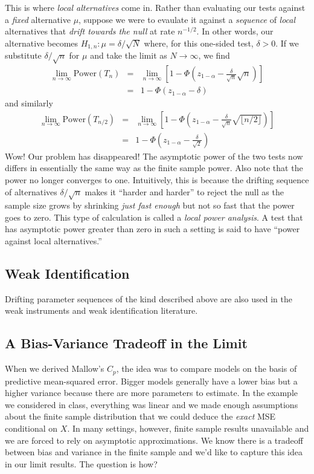 \documentclass[12pt]{article}
\theoremstyle{definition}
\begin{document}
This is where \emph{local alternatives} come in.
Rather than evaluating our tests against a \emph{fixed} alternative $\mu$, suppose we were to evaulate it against a \emph{sequence} of \emph{local} alternatives that \emph{drift towards the null} at rate $n^{-1/2}$. 
In other words, our alternative becomes $H_{1,n} \colon \mu = \delta / \sqrt{N}$ where, for this one-sided test, $\delta > 0$. 
If we substitute $\delta/\sqrt{n}$ for $\mu$ and take the limit as $N\rightarrow \infty$, we find
\begin{eqnarray*}
\lim_{n\rightarrow \infty} \mbox{Power}(T_{n}) &=& \lim_{n\rightarrow \infty}\left[1 - \Phi\left(z_{1-\alpha} - \frac{\delta}{\sqrt{n}}\sqrt{n}\right) \right]\\
&=& 1 - \Phi\left(z_{1-\alpha} - \delta \right)
\end{eqnarray*}
and similarly
\begin{eqnarray*}
\lim_{n\rightarrow \infty} \mbox{Power}(T_{n/2}) &=& \lim_{n\rightarrow \infty}\left[1 - \Phi\left(z_{1-\alpha} - \frac{\delta}{\sqrt{n}}\sqrt{\lfloor n/2 \rfloor }\right) \right]\\
&=& 1 - \Phi\left(z_{1-\alpha} - \frac{\delta}{\sqrt{2}} \right)
\end{eqnarray*}
Wow! Our problem has disappeared! 
The asymptotic power of the two tests now differs in essentially the same way as the finite sample power. 
Also note that the power no longer converges to one.
Intuitively, this is because the drifting sequence of alternatives $\delta/\sqrt{n}$ makes it ``harder and harder'' to reject the null as the sample size grows by shrinking \emph{just fast enough} but not so fast that the power goes to zero. 
This type of calculation is called a \emph{local power analysis}. 
A test that has asymptotic power greater than zero in such a setting is said to have ``power against local alternatives.''


\subsection{Weak Identification}
Drifting parameter sequences of the kind described above are also used in the weak instruments and weak identification literature.

\subsection{A Bias-Variance Tradeoff in the Limit}
When we derived Mallow's $C_p$, the idea was to compare models on the basis of predictive mean-squared error. 
Bigger models generally have a lower bias but a higher variance because there are more parameters to estimate. 
In the example we considered in class, everything was linear and we made enough assumptions about the finite sample distribution that we could deduce the \emph{exact} MSE conditional on $X$. 
In many settings, however, finite sample results unavailable and we are forced to rely on asymptotic approximations. 
We know there is a tradeoff between bias and variance in the finite sample and we'd like to capture this idea in our limit results. 
The question is how?
\end{document}
